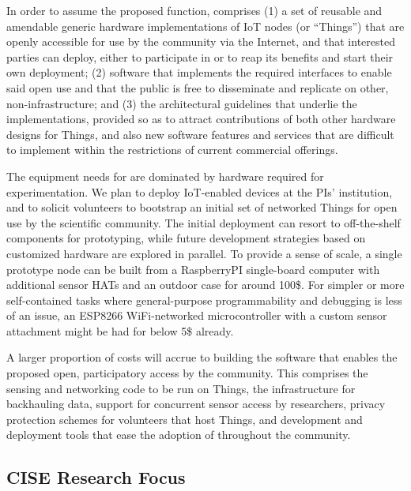 In order to assume the proposed function, \sysname comprises
(1) a set of reusable and amendable generic hardware implementations of
\gls{IoT} nodes (or ``Things'') that are openly accessible for
use by the community via the Internet, and that interested parties
can deploy, either to participate in \sysname or to reap its benefits
and start their own deployment;
(2) software that implements the required interfaces to
enable said open use and that the public is free to disseminate
and replicate on other, non-\sysname infrastructure; and
(3) the architectural guidelines that underlie the implementations,
provided so as to attract contributions of both other hardware
designs for Things, and also new software features and services
that are difficult to implement within the restrictions of current
commercial offerings.

The equipment needs for \sysname are dominated by hardware required
for experimentation. We plan to deploy \gls{IoT}-enabled devices
at the PIs' institution, and to solicit volunteers to bootstrap an
initial set of networked Things for open use by the scientific community.
The initial deployment can resort to off-the-shelf components
for prototyping, while future development strategies based on
customized hardware are explored in parallel.
To provide a sense of scale, a single prototype node can be built
from a RaspberryPI single-board computer with additional sensor
\glspl{HAT} and an outdoor case for around 100\$.
For simpler or more self-contained tasks where general-purpose
programmability and debugging is less of an issue, an ESP8266
WiFi-networked microcontroller with a custom sensor attachment
might be had for below 5\$ already.

A larger proportion of costs will accrue to building the software
that enables the proposed open, participatory access by the community.
This comprises the sensing and networking code to be run on Things,
the infrastructure for backhauling data, support for concurrent
sensor access by researchers, privacy protection schemes for
volunteers that host Things, and development and deployment tools
that ease the adoption of \sysname throughout the community.


\subsection{CISE Research Focus}

